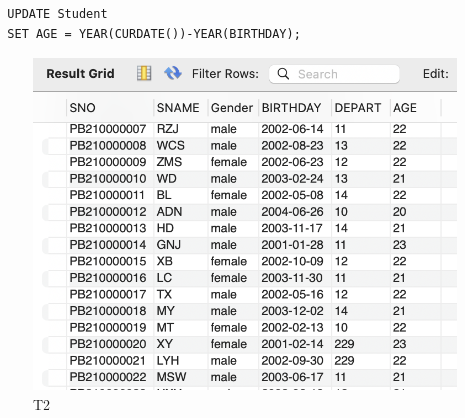 \documentclass[UTF8]{ctexart}
\begin{document}
\subsection{}
\begin{lstlisting}
  UPDATE Student
  SET AGE = YEAR(CURDATE())-YEAR(BIRTHDAY);
\end{lstlisting}
\begin{figure}[H]
  \centering
  \includegraphics[scale=0.4]{pics/2.png}
  \caption*{T2}
\end{figure}
\end{document}
